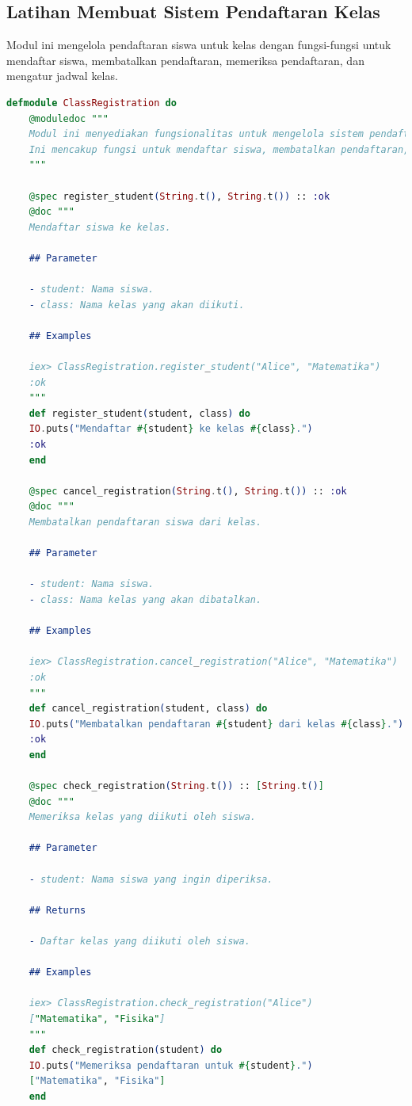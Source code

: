 \subsection{Latihan Membuat Sistem Pendaftaran Kelas}

Modul ini mengelola pendaftaran siswa untuk kelas dengan fungsi-fungsi untuk mendaftar siswa, membatalkan pendaftaran, memeriksa pendaftaran, dan mengatur jadwal kelas.

\begin{lstlisting}[language=Elixir, caption={Modul Pendaftaran Kelas}]
	defmodule ClassRegistration do
	@moduledoc """
	Modul ini menyediakan fungsionalitas untuk mengelola sistem pendaftaran kelas.
	Ini mencakup fungsi untuk mendaftar siswa, membatalkan pendaftaran, memeriksa pendaftaran, dan mengatur jadwal kelas.
	"""
	
	@spec register_student(String.t(), String.t()) :: :ok
	@doc """
	Mendaftar siswa ke kelas.
	
	## Parameter
	
	- student: Nama siswa.
	- class: Nama kelas yang akan diikuti.
	
	## Examples
	
	iex> ClassRegistration.register_student("Alice", "Matematika")
	:ok
	"""
	def register_student(student, class) do
	IO.puts("Mendaftar #{student} ke kelas #{class}.")
	:ok
	end
	
	@spec cancel_registration(String.t(), String.t()) :: :ok
	@doc """
	Membatalkan pendaftaran siswa dari kelas.
	
	## Parameter
	
	- student: Nama siswa.
	- class: Nama kelas yang akan dibatalkan.
	
	## Examples
	
	iex> ClassRegistration.cancel_registration("Alice", "Matematika")
	:ok
	"""
	def cancel_registration(student, class) do
	IO.puts("Membatalkan pendaftaran #{student} dari kelas #{class}.")
	:ok
	end
	
	@spec check_registration(String.t()) :: [String.t()]
	@doc """
	Memeriksa kelas yang diikuti oleh siswa.
	
	## Parameter
	
	- student: Nama siswa yang ingin diperiksa.
	
	## Returns
	
	- Daftar kelas yang diikuti oleh siswa.
	
	## Examples
	
	iex> ClassRegistration.check_registration("Alice")
	["Matematika", "Fisika"]
	"""
	def check_registration(student) do
	IO.puts("Memeriksa pendaftaran untuk #{student}.")
	["Matematika", "Fisika"]
	end
	

\end{lstlisting}
